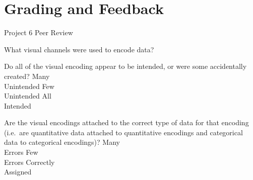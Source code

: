 \documentclass[a4paper,12pt]{article}
\begin{document}

\section{Grading and Feedback}

\feedback







\newpage


\begin{center}
{\huge Project 6 Peer Review}
\end{center}





	{What visual channels were used to encode data? }
    { 
    }
        
	{Do all of the visual encoding appear to be intended, or were some accidentally created?}
        {\choice Many\\Unintended}
        {\choice Few\\Unintended}
        {\choice All\\Intended} 
        
	{Are the visual encodings attached to the correct type of data for that 
    	encoding (i.e.\ are quantitative data attached to quantitative 
        encodings and categorical data to categorical encodings)?}
    {\choice Many\\Errors}
    {\choice Few\\Errors}
    {\choice Correctly\\Assigned} 
            
\end{document}
